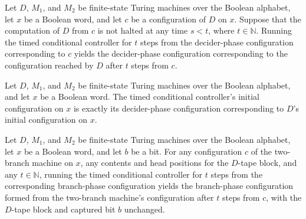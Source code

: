 \begin{lemma}
\label{Turing.FinTM.timed_capture}
\leanok
{}
Let $D$, $M_1$, and $M_2$ be finite-state Turing machines over the Boolean alphabet, let
$x$ be a Boolean word, and let $c$ be a configuration of $D$ on $x$. Suppose that the
computation of $D$ from $c$ is not halted at any time $s<t$, where $t\in\mathbb N$.
Running the timed conditional controller for $t$ steps from the decider-phase
configuration corresponding to $c$ yields the decider-phase configuration corresponding
to the configuration reached by $D$ after $t$ steps from $c$.
\end{lemma}

\begin{lemma}
\label{Turing.FinTM.timed_control_init}
\leanok
{}
Let $D$, $M_1$, and $M_2$ be finite-state Turing machines over the Boolean alphabet, and
let $x$ be a Boolean word. The timed conditional controller's initial configuration on
$x$ is exactly its decider-phase configuration corresponding to $D$'s initial
configuration on $x$.
\end{lemma}

\begin{lemma}
\label{Turing.FinTM.timed_branch_run}
\leanok
{}
Let $D$, $M_1$, and $M_2$ be finite-state Turing machines over the Boolean alphabet, let
$x$ be a Boolean word, and let $b$ be a bit. For any configuration $c$ of the two-branch
machine on $x$, any contents and head positions for the $D$-tape block, and any
$t\in\mathbb N$, running the timed conditional controller for $t$ steps from the
corresponding branch-phase configuration yields the branch-phase configuration formed
from the two-branch machine's configuration after $t$ steps from $c$, with the $D$-tape
block and captured bit $b$ unchanged.
\end{lemma}

